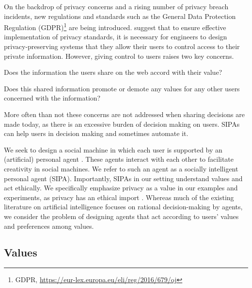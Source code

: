 On the backdrop of privacy concerns and a rising number of privacy breach incidents, new regulations and standards such as the General Data Protection Regulation (GDPR)\footnote{GDPR, \url{https://eur-lex.europa.eu/eli/reg/2016/679/oj}} are being introduced. 
\citet{spiekermann2009enggprivacy} suggest that to ensure effective implementation of privacy standards, it is necessary for engineers to design privacy-preserving systems that they allow their users to control access to their private information. 
However, giving control to users raises two key concerns. 
\begin{enuminline} 
\item Does the information the users share on the web accord with their value? 
\item Does this shared information promote or demote any values for any other users concerned with the information? 
\end{enuminline}
More often than not these concerns are not addressed when sharing decisions are made today, as there is an excessive burden of decision making on users. SIPAs can help users in decision making and sometimes automate it. 

We seek to design a social machine in which each user is supported by an (artificial) personal agent \citep{Murukannaiah-AAMAS14-Xipho}. These agents interact with each other to facilitate creativity in social machines. We refer to such an agent as a socially intelligent personal agent (SIPA). Importantly, SIPAs in our setting understand values and act ethically. We specifically emphasize privacy as a value in our examples and experiments, as privacy has an ethical import \citep{Friedman-2008-value-sensitive-design}. Whereas much of the existing literature on artificial intelligence focuses on rational decision-making by agents, we consider the problem of designing agents that act according to users' values and preferences among values.

\subsection{Values}

